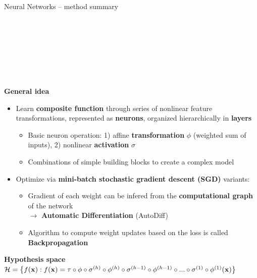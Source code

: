 \documentclass[11pt,compress,t,notes=noshow, xcolor=table]{beamer}
\newcommand{\highlight}[1]{\textcolor{hlcol}{\textbf{#1}}}
\newcommand{\maketag}[2][100]{
  \colorbox{hlcol!#1}{\textcolor{white}{\MakeUppercase{\scriptsize #2}} 
  \vphantom{}}
}
\begin{document}
\begin{frame2}{Neural Networks -- method summary}

  \maketag{regression} \maketag{classification}
  \maketag[50]{(non)parametric}
  \maketag{BLACK-BOX} %
  
  \medskip
  
  \highlight{General idea}
  \begin{itemize}
    \item Learn \textbf{composite function} through series of nonlinear feature 
    transformations, represented as \textbf{neurons}, organized hierarchically 
    in \textbf{layers}
    \begin{itemize}
      \item Basic neuron operation: 1) affine \textbf{transformation} $\phi$ (weighted sum of inputs), 
      2) nonlinear \textbf{activation} $\sigma$
      \item Combinations of simple building 
      blocks to create a complex model
    \end{itemize}
    \item Optimize via \textbf{mini-batch stochastic gradient descent (SGD)} variants:
    \begin{itemize}
      \item Gradient of each weight can be infered from the \textbf{computational graph} of the network\\
      $\rightarrow$ \textbf{Automatic Differentiation} (AutoDiff)
      \item Algorithm to compute weight updates based on the loss is called \textbf{Backpropagation}
    \end{itemize}
  \end{itemize}
  
  \medskip
   
  \highlight{Hypothesis space} ~~
  $\mathcal{H} = \left\{ f(\mathbf{x}): f(\mathbf{x}) = \tau \circ \phi \circ \sigma^{(h)} \circ
  \phi^{(h)} \circ \sigma^{(h - 1)} \circ \phi^{(h - 1)} \circ ... \circ 
  \sigma^{(1)} \circ \phi^{(1)} (\mathbf{x}) \right\}$
  

\end{frame2}
\end{document}
